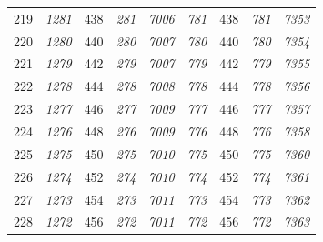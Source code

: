 \documentclass[10pt,fleqn]{article}
\begin{document}
\begin{longtable}{c|cccccccc}
219 & {\color{blue} \it 1281 \rm} & {\color{black} 438} & {\color{blue} \it 281 \rm} & {\color{blue} \it 7006 \rm} & {\color{blue} \it 781 \rm} & {\color{black} 438} & {\color{blue} \it 781 \rm} & {\color{blue} \it 7353 \rm} \\
220 & {\color{blue} \it 1280 \rm} & {\color{black} 440} & {\color{blue} \it 280 \rm} & {\color{blue} \it 7007 \rm} & {\color{blue} \it 780 \rm} & {\color{black} 440} & {\color{blue} \it 780 \rm} & {\color{blue} \it 7354 \rm} \\
221 & {\color{blue} \it 1279 \rm} & {\color{black} 442} & {\color{blue} \it 279 \rm} & {\color{blue} \it 7007 \rm} & {\color{blue} \it 779 \rm} & {\color{black} 442} & {\color{blue} \it 779 \rm} & {\color{blue} \it 7355 \rm} \\
222 & {\color{blue} \it 1278 \rm} & {\color{black} 444} & {\color{blue} \it 278 \rm} & {\color{blue} \it 7008 \rm} & {\color{blue} \it 778 \rm} & {\color{black} 444} & {\color{blue} \it 778 \rm} & {\color{blue} \it 7356 \rm} \\
223 & {\color{blue} \it 1277 \rm} & {\color{black} 446} & {\color{blue} \it 277 \rm} & {\color{blue} \it 7009 \rm} & {\color{blue} \it 777 \rm} & {\color{black} 446} & {\color{blue} \it 777 \rm} & {\color{blue} \it 7357 \rm} \\
224 & {\color{blue} \it 1276 \rm} & {\color{black} 448} & {\color{blue} \it 276 \rm} & {\color{blue} \it 7009 \rm} & {\color{blue} \it 776 \rm} & {\color{black} 448} & {\color{blue} \it 776 \rm} & {\color{blue} \it 7358 \rm} \\
225 & {\color{blue} \it 1275 \rm} & {\color{black} 450} & {\color{blue} \it 275 \rm} & {\color{blue} \it 7010 \rm} & {\color{blue} \it 775 \rm} & {\color{black} 450} & {\color{blue} \it 775 \rm} & {\color{blue} \it 7360 \rm} \\
226 & {\color{blue} \it 1274 \rm} & {\color{black} 452} & {\color{blue} \it 274 \rm} & {\color{blue} \it 7010 \rm} & {\color{blue} \it 774 \rm} & {\color{black} 452} & {\color{blue} \it 774 \rm} & {\color{blue} \it 7361 \rm} \\
227 & {\color{blue} \it 1273 \rm} & {\color{black} 454} & {\color{blue} \it 273 \rm} & {\color{blue} \it 7011 \rm} & {\color{blue} \it 773 \rm} & {\color{black} 454} & {\color{blue} \it 773 \rm} & {\color{blue} \it 7362 \rm} \\
228 & {\color{blue} \it 1272 \rm} & {\color{black} 456} & {\color{blue} \it 272 \rm} & {\color{blue} \it 7011 \rm} & {\color{blue} \it 772 \rm} & {\color{black} 456} & {\color{blue} \it 772 \rm} & {\color{blue} \it 7363 \rm} \\

\end{longtable}
\end{document}
